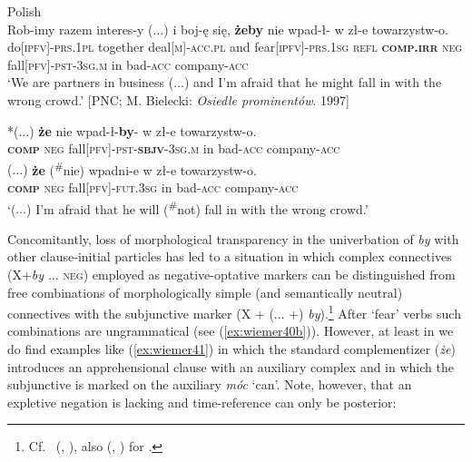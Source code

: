 \documentclass[output=paper,colorlinks,citecolor=brown]{langscibook}
\begin{document}
\ea 
\label{ex:wiemer40} 
\textnormal{Polish} \\
\ea \label{ex:wiemer40a} 
\gll Rob-imy razem interes-y \textnormal{($\ldots$)}
 i boj-ę się, \textbf{żeby} nie wpad-ł-\emptyset {} w zł-e towarzystw-o. \\
do\textsc{[ipfv]-prs.1pl} together deal\textsc{[m]-acc.pl} {} and fear\textsc{[ipfv]-prs.1sg} \textsc{refl} \textbf{\textsc{comp.irr}} \textsc{neg} fall\textsc{[pfv]-pst-3sg.m} in bad-\textsc{acc} company-\textsc{acc} \\
\glt `We are partners in business ($\ldots$) and I'm afraid that he might fall in with the wrong crowd.' {[PNC; M. Bielecki: \textit{Osiedle prominentów}. 1997}]

\ex \label{ex:wiemer40b}
\gll \textnormal{*($\ldots$)} \textbf{że} nie wpad-ł-\textbf{by}-\emptyset {} w zł-e towarzystw-o. \\
{} \textbf{\textsc{comp}} \textsc{neg} fall\textsc{[pfv]-pst-\textbf{sbjv}-3sg.m} in bad-\textsc{acc} company-\textsc{acc} \\
\ex \label{ex:wiemer40c}
\gll \textnormal{($\ldots$)} \textbf{że} (\textsuperscript{\#}nie) wpadni-e w zł-e towarzystw-o. \\
{} \textbf{\textsc{comp}} \textsc{neg} fall\textsc{[pfv]-fut.3sg} in bad-\textsc{acc} company-\textsc{acc} \\
\glt `($\ldots$) I'm afraid that he will (\textsuperscript{\#}not) fall in with the wrong crowd.'
\z
\z


Concomitantly, loss of morphological transparency in the univerbation of \textit{by} with other clause-initial particles has led to a situation in which complex connectives (X+\textit{by $\ldots$} \textsc{neg}) employed as negative-optative markers can be distinguished from free combinations of morphologically simple (and semantically neutral) connectives with the subjunctive marker (X + ($\ldots$ +) \textit{by}).\footnote{Cf.\ \citeauthor{Wiemer2015} (\citeyear{Wiemer2015}, \citeyear[\S3.1]{Wiemer2023}), also \citeauthor{Dobrushina2012} (\citeyear{Dobrushina2012}, \citeyear[322--327]{Dobrushina2016}) for .} After `fear' verbs such combinations are ungrammatical (see (\ref{ex:wiemer40b})). However, at least in  we do find examples like (\ref{ex:wiemer41}) in which the standard complementizer (\textit{że}) introduces an apprehensional clause with an auxiliary complex and in which the subjunctive is marked on the auxiliary \textit{móc} `can'. Note, however, that an expletive negation is lacking and time-reference can only be posterior:
\end{document}
